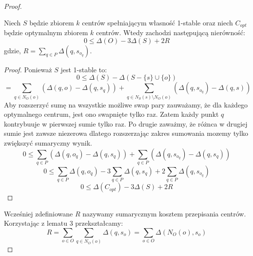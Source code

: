 \begin{proof}
    \begin{lemma}{\cite{10.1145/1007352.1007400}}
        Niech $S$ będzie zbiorem $k$ centrów spełniającym własność 1-stable oraz niech $C_{opt}$ będzie optymalnym zbiorem $k$ centrów.
        Wtedy zachodzi następującą nierówność:
        \begin{equation}
            0 \leq \Delta(O) - 3\Delta(S) + 2R
        \end{equation}
        gdzie, $R = \sum_{q \in P} \Delta(q, s_{o_{q}})$.
    \end{lemma}
    \begin{proof}
        Ponieważ $S$ jest 1-stable to:
        \begin{equation}
           0 \leq \Delta(S) -  \Delta(S - \{s\} \cup \{o\})
        \end{equation}
        \begin{equation}
            = \sum_{q \in N_{O}(o)} (\Delta(q, o) - \Delta(q, s_{q})) + \sum_{q \in N_{S}(s) \setminus N_{O}(o)} (\Delta(q, s_{o_{q}}) - \Delta(q, s))
        \end{equation}
        Aby rozszerzyć sumę na wszystkie możliwe swap pary zauważamy, że dla każdego optymalnego centrum, jest ono swapnięte tylko raz.
        Zatem każdy punkt $q$ kontrybuuje w pierwszej sumie tylko raz.
        Po drugie zaważmy, że różnca w drugiej sumie jest zawsze niezerowa dlatego rozszerzając zakres sumowania mozemy tylko zwiększyć sumaryczny wynik.
        \begin{equation}
            0 \leq \sum_{q \in P} (\Delta(q, o_{q}) - \Delta(q, s_{q})) + \sum_{q \in P} (\Delta(q, s_{o_{q}}) - \Delta(q, s_{q}))
        \end{equation}
        \begin{equation}
            0 \leq \sum_{q \in P} \Delta(q, o_{q}) - 3 \sum_{q \in P} \Delta(q, s_{q}) + 2\sum_{q \in P} \Delta(q, s_{o_{q}})
        \end{equation}
        \begin{equation}
            0 \leq \Delta(C_{opt}) - 3 \Delta(S) + 2R
        \end{equation}
    \end{proof}
    \noindent
    Wcześniej zdefiniowane $R$ nazywamy sumarycznym kosztem przepisania centrów.
    Korzystając z lematu 3 przekształcamy:
    \begin{equation}
        R = \sum_{o \in O} \sum_{q \in N_{O}(o)} \Delta(q, s_{o}) = \sum_{o \in O} \Delta(N_{O}(o), s_{o}) 
    \end{equation}

\end{proof}
